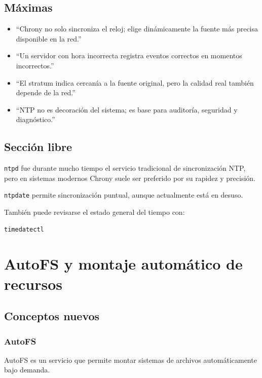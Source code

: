 \documentclass[11pt, letterpaper]{article}
\begin{document}
\subsection{Máximas}
\label{sec:org4c734a8}
\begin{itemize}
\item “Chrony no solo sincroniza el reloj; elige dinámicamente la fuente más precisa disponible en la red.”
\item “Un servidor con hora incorrecta registra eventos correctos en momentos incorrectos.”
\item “El stratum indica cercanía a la fuente original, pero la calidad real también depende de la red.”
\item “NTP no es decoración del sistema; es base para auditoría, seguridad y diagnóstico.”
\end{itemize}
\subsection{Sección libre}
\label{sec:org81bb5b9}

\texttt{ntpd} fue durante mucho tiempo el servicio tradicional de sincronización NTP, pero en sistemas modernos Chrony suele ser preferido por su rapidez y precisión.

\texttt{ntpdate} permite sincronización puntual, aunque actualmente está en desuso.

También puede revisarse el estado general del tiempo con:

\begin{verbatim}
timedatectl
\end{verbatim}

\newpage
\section{AutoFS y montaje automático de recursos}
\label{sec:org1400f5a}

\subsection{Conceptos nuevos}
\label{sec:org0bc143d}

\subsubsection{AutoFS}
\label{sec:orgde84e3a}

AutoFS es un servicio que permite montar sistemas de archivos automáticamente bajo demanda.
\end{document}
